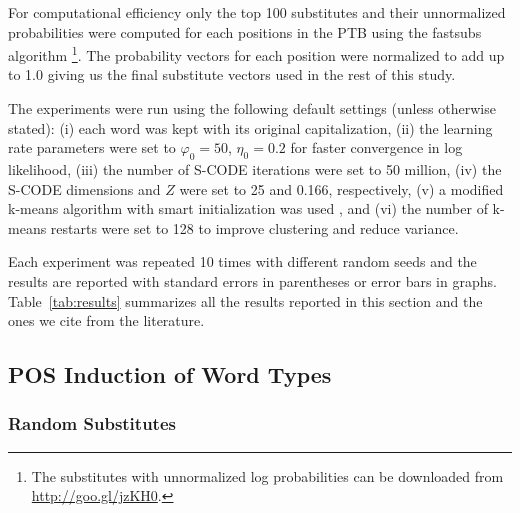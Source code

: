 For computational efficiency only the top 100 substitutes and their
unnormalized probabilities were computed for each positions in the PTB
using the {\sc fastsubs} algorithm
\cite{yuret2012fastsub}\footnote{The substitutes with unnormalized log
  probabilities can be downloaded from
  \mbox{\url{http://goo.gl/jzKH0}}.}.  The probability vectors for
each position were normalized to add up to 1.0 giving us the final
substitute vectors used in the rest of this study.

The experiments were run using the following default settings (unless
otherwise stated): (i) each word was kept with its original
capitalization, (ii) the learning rate parameters were set to
$\varphi_0=50$, $\eta_0=0.2$ for faster convergence in log likelihood,
(iii) the number of S-CODE iterations were set to 50 million, (iv) the
S-CODE dimensions and $Z$ were set to 25 and 0.166, respectively, (v)
a modified k-means algorithm with smart initialization was used
\cite{arthur2007k}, and (vi) the number of k-means restarts were set
to 128 to improve clustering and reduce variance.

Each experiment was repeated 10 times with different random seeds and
the results are reported with standard errors in parentheses or error
bars in graphs.  Table~\ref{tab:results} summarizes all the results
reported in this section and the ones we cite from the literature.

\subsection{POS Induction of Word Types}
\label{sec:pos-type}

\subsubsection{Random Substitutes}
\label{sec:wordsub-type}

